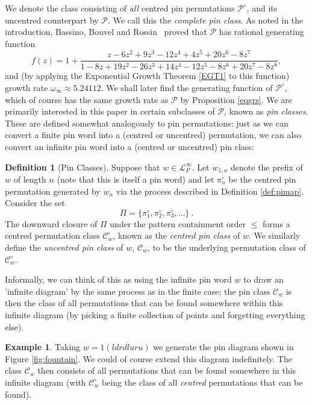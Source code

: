 \documentclass[11pt,a4paper]{article}
\theoremstyle{definition}
\newtheorem{defn}[thm]{Definition}
\newtheorem{example}[thm]{Example}
\begin{document}
We denote the class consisting of \emph{all} centred pin permutations $\mathcal{P}^{\circ}$, and its uncentred counterpart by $\mathcal{P}$. We call this the \emph{complete pin class}. As noted in the introduction, Bassino, Bouvel and Rossin~\cite{bassino:enumeration-of-:} proved that $\mathcal{P}$ has rational generating function
\[ 
f(z) = 1 + \frac{z - 6z^2 + 9z^3 - 12z^4 + 4z^5 + 20z^6 - 8z^7}{1 - 8z + 19z^2 - 26z^3 + 14z^4 - 12z^5 - 8z^6 + 20z^7 - 8z^8},
\]
and (by applying the Exponential Growth Theorem \ref{EGT1} to this function) growth rate $\omega_{\infty} \approx 5.24112$. We shall later find the generating function of $\mathcal{P}^{\circ}$, which of course has the same growth rate as $\mathcal{P}$ by Proposition \ref{eqgrs}. We are primarily interested in this paper in certain subclasses of $\mathcal{P}$, known as \emph{pin classes}. These are defined somewhat analogously to pin permutations: just as we can convert a finite pin word into a (centred or uncentred) permutation, we can also convert an infinite pin word into a (centred or uncentred) pin class:

\begin{defn}[Pin Classes]
Suppose that $w \in \mathcal{L}^{\infty}_{P}$. Let $w_{1,n}$ denote the prefix of $w$ of length $n$ (note that this is itself a pin word) and let $\pi^{\circ}_{n}$ be the centred pin permutation generated by $w_{n}$ via the process described in Definition \ref{def:pimap}. Consider the set
\[
\Pi = \{ \pi^{\circ}_{1}, \pi^{\circ}_{2}, \pi^{\circ}_{3}, \dots \} \ .
\]
The downward closure of $\Pi$ under the pattern containment order $\leq$ forms a centred permutation class $\mathcal{C}^{\circ}_{w}$, known as the \emph{centred pin class} of $w$. We similarly define the \emph{uncentred pin class} of $w$, $\mathcal{C}_{w}$, to be the underlying permutation class of $\mathcal{C}^{\circ}_{w}$.
\end{defn}

Informally, we can think of this as using the infinite pin word $w$ to draw an 'infinite diagram' by the same process as in the finite case; the pin class $\mathcal{C}_{w}$ is then the class of all permutations that can be found somewhere within this infinite diagram (by picking a finite collection of points and forgetting everything else).

\begin{example}
Taking $w=1\overline{(ldrdluru)}$ we generate the pin diagram shown in Figure \ref{fig:fountain}. We could of course extend this diagram indefinitely. The class $\mathcal{C}_{w}$ then consists of all permutations that can be found somewhere in this infinite diagram (with $\mathcal{C}^{\circ}_{w}$ being the class of all \emph{centred} permutations that can be found).
\end{example}
\end{document}
